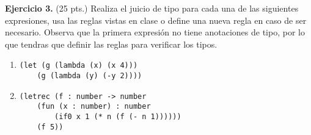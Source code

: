 \textbf{Ejercicio 3.} (25 pts.) Realiza el juicio de tipo para cada una de las siguientes expresiones, usa las reglas vistas en clase o define una nueva regla en caso de ser necesario. Observa que la primera expresión no tiene anotaciones de tipo, por lo que tendras que definir las reglas para verificar los tipos. \vspace{0.3cm}

\begin{enumerate}
\item 
\begin{lstlisting}
(let (g (lambda (x) (x 4)))
    (g (lambda (y) (-y 2))))
\end{lstlisting}

\item 
\begin{lstlisting}
(letrec (f : number -> number
    (fun (x : number) : number
        (if0 x 1 (* n (f (- n 1))))))
    (f 5))
\end{lstlisting}
\end{enumerate}